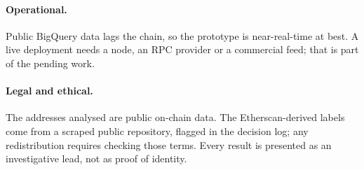 \paragraph{Operational.} Public BigQuery data lags the chain, so the prototype is near-real-time at best. A live deployment needs a node, an RPC provider or a commercial feed; that is part of the pending work.

\paragraph{Legal and ethical.} The addresses analysed are public on-chain data. The Etherscan-derived labels come from a scraped public repository, flagged in the decision log; any redistribution requires checking those terms. Every result is presented as an investigative lead, not as proof of identity.
